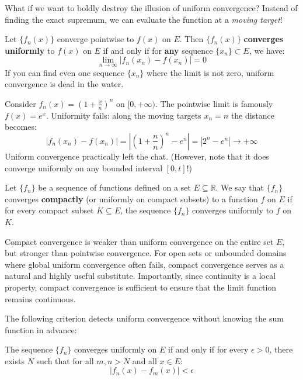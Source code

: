 What if we want to boldly destroy the illusion of uniform convergence? Instead of finding the exact supremum, we can evaluate the function at a \textit{moving target}!

\begin{theorem}
Let $\{f_n(x)\}$ converge pointwise to $f(x)$ on $E$. Then $\{f_n(x)\}$ \textbf{converges uniformly} to $f(x)$ on $E$ if and only if for \textbf{any} sequence $\{x_n\} \subset E$, we have:
\[ \lim_{n \to \infty} \left| f_n(x_n) - f(x_n) \right| = 0 \]
If you can find even one sequence $\{x_n\}$ where the limit is not zero, uniform convergence is dead in the water.
\end{theorem}

\begin{example}
Consider $f_n(x) = \left(1+\frac{x}{n}\right)^n$ on $[0,+\infty)$. The pointwise limit is famously $f(x) = e^x$. 
Uniformity fails: along the moving targets $x_n = n$ the distance becomes:
\[ |f_n(x_n) - f(x_n)| = \left| \left(1+\frac{n}{n}\right)^n - e^n \right| = |2^n - e^n| \to +\infty \]
Uniform convergence practically left the chat. (However, note that it does converge uniformly on any bounded interval $[0, t]$!)
\end{example}

\begin{definition}
    Let $\{f_n\}$ be a sequence of functions defined on a set $E \subseteq \mathbb{R}$. We say that $\{f_n\}$ converges \textbf{compactly} (or uniformly on compact subsets) to a function $f$ on $E$ if for every compact subset $K \subseteq E$, the sequence $\{f_n\}$ converges uniformly to $f$ on $K$.
\end{definition}

Compact convergence is weaker than uniform convergence on the entire set $E$, but stronger than pointwise convergence. For open sets or unbounded domains where global uniform convergence often fails, compact convergence serves as a natural and highly useful substitute. Importantly, since continuity is a local property, compact convergence is sufficient to ensure that the limit function remains continuous.

The following criterion detects uniform convergence without knowing the sum function in advance:

\begin{theorem}
The sequence $\{f_n\}$ converges uniformly on $E$ if and only if for every $\epsilon > 0$, there exists $N$ such that for all $m, n > N$ and all $x \in E$:
\[ |f_n(x) - f_m(x)| < \epsilon \]
\end{theorem}

